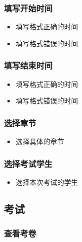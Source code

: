 \documentclass[hyperref, a4paper]{ctexart}
\providecommand{\tightlist}{%
  \setlength{\itemsep}{0pt}\setlength{\parskip}{0pt}}
\begin{document}
\hypertarget{ux586bux5199ux5f00ux59cbux65f6ux95f4}{%
\subsubsection{填写开始时间}\label{ux586bux5199ux5f00ux59cbux65f6ux95f4}}

\begin{itemize}
\tightlist
\item
  填写格式正确的时间
\item
  填写格式错误的时间
\end{itemize}

\hypertarget{ux586bux5199ux7ed3ux675fux65f6ux95f4}{%
\subsubsection{填写结束时间}\label{ux586bux5199ux7ed3ux675fux65f6ux95f4}}

\begin{itemize}
\tightlist
\item
  填写格式正确的时间
\item
  填写格式错误的时间
\end{itemize}

\hypertarget{ux9009ux62e9ux7ae0ux8282}{%
\subsubsection{选择章节}\label{ux9009ux62e9ux7ae0ux8282}}

\begin{itemize}
\tightlist
\item
  选择具体的章节
\end{itemize}

\hypertarget{ux9009ux62e9ux8003ux8bd5ux5b66ux751f}{%
\subsubsection{选择考试学生}\label{ux9009ux62e9ux8003ux8bd5ux5b66ux751f}}

\begin{itemize}
\tightlist
\item
  选择本次考试的学生
\end{itemize}

\hypertarget{ux8003ux8bd5}{%
\subsection{考试}\label{ux8003ux8bd5}}

\hypertarget{ux67e5ux770bux8003ux5377}{%
\subsubsection{查看考卷}\label{ux67e5ux770bux8003ux5377}}
\end{document}
